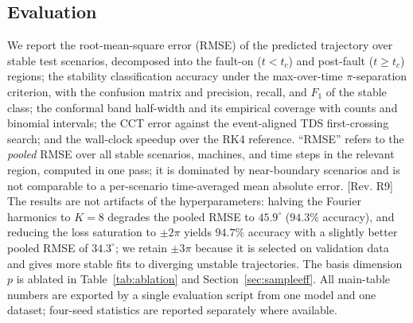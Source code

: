 \documentclass[5p,times]{elsarticle}
\begin{document}
\subsection{Evaluation}
We report the root-mean-square error (RMSE) of the predicted trajectory over stable test
scenarios, decomposed into the fault-on ($t<t_c$) and post-fault ($t\ge t_c$) regions; the
stability classification accuracy under the max-over-time $\pi$-separation criterion, with the
confusion matrix and precision, recall, and $F_1$ of the stable class; the conformal band
half-width and its empirical coverage with counts and binomial intervals; the CCT error against
the event-aligned TDS first-crossing search; and the wall-clock speedup over the RK4 reference. ``RMSE''
refers to the \emph{pooled} RMSE over all stable scenarios, machines, and time steps in the
relevant region, computed in one pass; it is dominated by near-boundary scenarios and is not
comparable to a per-scenario time-averaged mean absolute error. [Rev. R9] The results are not artifacts of the hyperparameters: halving the Fourier harmonics
to $K{=}8$ degrades the pooled RMSE to $45.9^\circ$ ($94.3\%$ accuracy), and reducing the loss
saturation to $\pm2\pi$ yields $94.7\%$ accuracy with a slightly better pooled RMSE of
$34.3^\circ$; we retain $\pm3\pi$ because it is selected on validation data and gives more
stable fits to diverging unstable trajectories. The basis dimension $p$ is ablated in
Table~\ref{tab:ablation} and Section~\ref{sec:sampleeff}. All main-table numbers are
exported by a single evaluation script from one model and one dataset; four-seed statistics are
reported separately where available.
\end{document}
